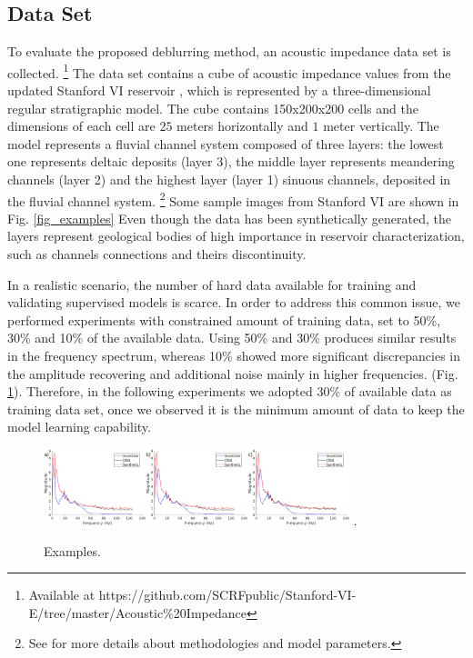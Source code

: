\documentclass[journal]{IEEEtran}
\begin{document}
\subsection{Data Set}
To evaluate the proposed deblurring method, an acoustic
impedance data set is collected. \footnote{Available at https://github.com/SCRFpublic/Stanford-VI-E/tree/master/Acoustic\%20Impedance} %
The data set contains a cube of acoustic impedance values
from the updated Stanford VI reservoir \cite{Lee2012}, which
is represented by a three-dimensional regular stratigraphic
model. The cube contains 150x200x200 cells and the dimensions
of each cell are $25$ meters horizontally and $1$ meter vertically.
The model represents a fluvial channel system composed of three
layers: the lowest one represents deltaic deposits (layer 3), the
middle layer represents meandering channels (layer 2) and the highest
layer (layer 1) sinuous channels, deposited in the fluvial channel system.
\footnote{See \cite{Castro2005} for more details about methodologies and model parameters.}
Some sample images from Stanford VI are shown in Fig. \ref{fig_examples}
Even though the data has been synthetically generated,
the layers represent geological bodies of high importance
in reservoir characterization, such as channels connections and theirs
discontinuity. 

In a realistic scenario, the number of hard data available for
training and validating supervised models is scarce. In order
to address this common issue, we performed experiments with
constrained amount of training data, set to 50\%, 30\% and
10\% of the available data. Using 50\% and 30\% 
produces similar results in the frequency spectrum,
whereas 10\% showed more significant discrepancies in the
amplitude recovering and additional noise mainly in higher frequencies.
(Fig. \ref{fig_imgs}). Therefore, in the following experiments
we adopted 30\% of available data as training data set, once we
observed it is the minimum amount of data to keep the model learning
capability.
\begin{figure}[!t]
\centering
\includegraphics[width=3.5in]{Figs/Images}
\DeclareGraphicsExtensions.
\caption{Examples.}
\label{fig_imgs}
\end{figure}
\end{document}
